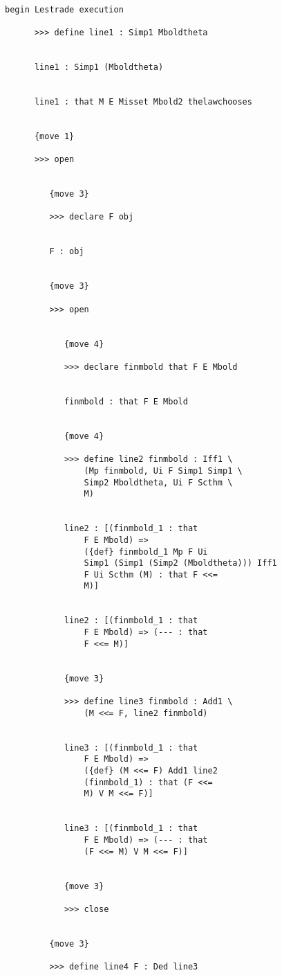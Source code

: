 \documentclass[12pt]{article}
\begin{document}
\begin{verbatim}

begin Lestrade execution

      >>> define line1 : Simp1 Mboldtheta


      line1 : Simp1 (Mboldtheta)


      line1 : that M E Misset Mbold2 thelawchooses


      {move 1}

      >>> open


         {move 3}

         >>> declare F obj


         F : obj


         {move 3}

         >>> open


            {move 4}

            >>> declare finmbold that F E Mbold


            finmbold : that F E Mbold


            {move 4}

            >>> define line2 finmbold : Iff1 \
                (Mp finmbold, Ui F Simp1 Simp1 \
                Simp2 Mboldtheta, Ui F Scthm \
                M)


            line2 : [(finmbold_1 : that 
                F E Mbold) => 
                ({def} finmbold_1 Mp F Ui 
                Simp1 (Simp1 (Simp2 (Mboldtheta))) Iff1 
                F Ui Scthm (M) : that F <<= 
                M)]


            line2 : [(finmbold_1 : that 
                F E Mbold) => (--- : that 
                F <<= M)]


            {move 3}

            >>> define line3 finmbold : Add1 \
                (M <<= F, line2 finmbold)


            line3 : [(finmbold_1 : that 
                F E Mbold) => 
                ({def} (M <<= F) Add1 line2 
                (finmbold_1) : that (F <<= 
                M) V M <<= F)]


            line3 : [(finmbold_1 : that 
                F E Mbold) => (--- : that 
                (F <<= M) V M <<= F)]


            {move 3}

            >>> close


         {move 3}

         >>> define line4 F : Ded line3



\end{verbatim}
\end{document}
